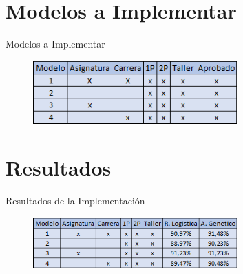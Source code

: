 \documentclass{beamer}
\begin{document}
\section{Modelos a Implementar}
\begin{frame}{Modelos a Implementar}
    \begin{figure}
        \centering
        \includegraphics[width=0.7\textwidth]{Imagenes/modelos.png}
    \end{figure}
\end{frame}

\section{Resultados}

\begin{frame}{Resultados de la Implementación}
    \begin{figure}
        \centering
        \includegraphics[width=0.7\textwidth]{Imagenes/modelos2.png}
    \end{figure}
\end{frame}
\end{document}
